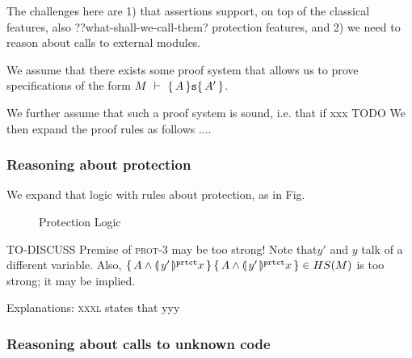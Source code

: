 The challenges here are 1) that \AssertLang assertions support, on top of the classical features, also ??what-shall-we-call-them? protection features, and 2) we need to reason about calls to external modules.


We assume that there exists some
proof system  that   allows us to prove 
 specifications of the form  $M\ \vdash\ \{\,A\, \} {\texttt{s}} \{\,A'\, \}$.
{We further assume that such a proof system is sound, i.e. that 
if xxx TODO 
 We then expand the proof rules as follows ....

\subsubsection{Reasoning about protection}
We expand that logic with rules about protection, as in Fig. 

\begin{figure}[hbt]
\footnotesize
{}
\caption{Protection Logic}
\label{f:protection}
\end{figure}

TO-DISCUSS Premise of  \textsc{prot-3} may be too strong! Note that$y'$ and $y$ talk of a different variable.
Also, ${{\{}\, A \wedge \llparenthesis \, y'\, \rrparenthesis^{{\texttt{prtct}}} x \,{\}} \,{\{}\, A \wedge \llparenthesis \, y'\, \rrparenthesis^{{\texttt{prtct}}} x \,{\}}} \in HS(M)$ is too strong; it may be implied.
 

Explanations: \textsc{xxxl} states that   yyy
  
 
\subsubsection{Reasoning about calls to unknown code}

}
